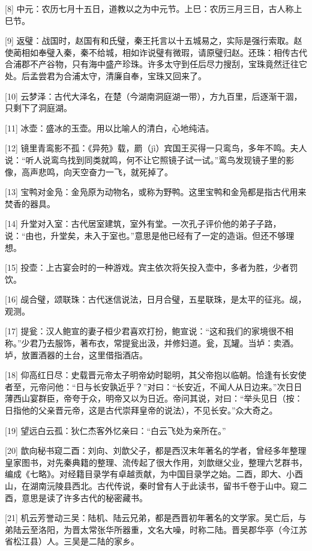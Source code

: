 \documentclass[12pt,UTF8]{ctexbook}
\begin{document}
[8] 中元：农历七月十五日，道教以之为中元节。上巳：农历三月三日，古人称上巳节。

[9] 返璧：战国时，赵国有和氏璧，秦王托言以十五城易之，实际是强行索取。赵使蔺相如奉璧入秦，秦不给城，相如诈说璧有微瑕，请原璧归赵。还珠：相传古代合浦郡不产谷物，只有海中盛产珍珠。许多太守到任后尽力搜刮，宝珠竟然迁往它处。后孟尝君为合浦太守，清廉自奉，宝珠又回来了。

[10] 云梦泽：古代大泽名，在楚（今湖南洞庭湖一带），方九百里，后逐渐干涸，只剩下了洞庭湖。

[11] 冰壶：盛冰的玉壶。用以比喻人的清白，心地纯洁。

[12] 镜里青鸾影不孤：《异苑》载，罽（jì）宾国王买得一只鸾鸟，多年不鸣。夫人说：“听人说鸾鸟找到同类就鸣，何不让它照镜子试一试。”鸾鸟发现镜子里的影像，高声悲鸣，向天空奋力一飞，就死掉了。

[13] 宝鸭对金凫：金凫原为动物名，或称为野鸭。这里宝鸭和金凫都是指古代用来焚香的器具。

[14] 升堂对入室：古代居室建筑，室外有堂。一次孔子评价他的弟子子路，说：“由也，升堂矣，未入于室也。”意思是他已经有了一定的造诣。但还不够理想。

[15] 投壶：上古宴会时的一种游戏。宾主依次将矢投入壶中，多者为胜，少者罚饮。

[16] 觇合璧，颂联珠：古代迷信说法，日月合璧，五星联珠，是太平的征兆。觇，观测。

[17] 提瓮：汉人鲍宣的妻子桓少君喜欢打扮，鲍宣说：“这和我们的家境很不相称。”少君乃去服饰，著布衣，常提瓮出汲，并修妇道。瓮，瓦罐。当垆：卖酒。垆，放置酒器的土台，这里借指酒店。

[18] 仰高红日尽：史载晋元帝太子明帝幼时聪明，其父帝抱以临朝。恰逢有长安使者至，元帝问他：“日与长安孰近乎？”对曰：“长安近，不闻人从日边来。”次日日薄西山宴群臣，帝夸于众，明帝又以为日近。帝问其说，对曰：“举头见日（按：日指他的父亲晋元帝，这是古代崇拜皇帝的说法），不见长安。”众大奇之。

[19] 望远白云孤：狄仁杰客外忆亲曰：“白云飞处为亲所在。”

[20] 歆向秘书窥二酉：刘向、刘歆父子，都是西汉末年著名的学者，曾经多年整理皇家图书，对先秦典籍的整理、流传起了很大作用，刘歆继父业，整理六艺群书，编成《七略》。对经籍目录学有卓越贡献，为中国目录学之始。二酉，即大、小酉山，在湖南沅陵县西北。古代传说，秦时曾有人于此读书，留书千卷于山中。窥二酉，意思是读了许多古代的秘密藏书。

[21] 机云芳誉动三吴：陆机、陆云兄弟，都是西晋初年著名的文学家。吴亡后，与弟陆云至洛阳，为晋太常张华所器重，文名大噪，时称二陆。晋吴郡华亭（今江苏省松江县）人。三吴是二陆的家乡。
\end{document}
